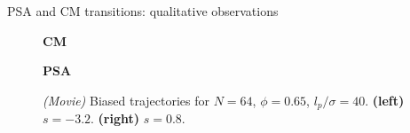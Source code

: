 \documentclass{beamer}
\begin{document}
\begin{frame}{PSA and CM transitions: qualitative observations}

\begin{figure}
\begin{minipage}{0.48\linewidth}
\centering
\bf CM
\end{minipage}
\hfill
\begin{minipage}{0.48\linewidth}
\centering
\bf PSA
\end{minipage}
\hfill\hfill
\caption{\textit{(Movie)} Biased trajectories for $N = 64$, $\phi = 0.65$, $l_p/\sigma = 40$. {\bf (left)} $s = -3.2$. {\bf (right)} $s = 0.8$. }
\end{figure}


\end{frame}
\end{document}
